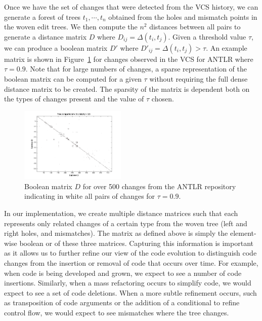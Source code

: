 Once we have the set of changes that were detected from the VCS history, we
can generate a forest of trees $t_1, \cdots, t_n$ obtained from the holes and
mismatch points in the woven edit trees.  We then compute the $n^2$ distances
between all pairs to generate a distance matrix $D$ where $D_{ij} =
\Delta(t_i, t_j)$.  Given a threshold value $\tau$, we can produce a boolean
matrix $D'$ where $D'_{ij} = \Delta(t_i, t_j) > \tau$.  An example matrix is
shown in Figure~\ref{fig:boolmat} for changes observed in the VCS for ANTLR
where $\tau = 0.9$.  Note that for large numbers of changes, a sparse
representation of the boolean matrix can be computed for a given $\tau$
without requiring the full dense distance matrix to be created.  The sparsity
of the matrix is dependent both on the types of changes present and the value
of $\tau$ chosen.  

\begin{figure}
\begin{center}
\includegraphics[width=0.45\textwidth]{figures/distmatrix-0-9.png}
\caption{Boolean matrix $D$ for over 500 changes from the ANTLR repository indicating in white all pairs of
changes for $\tau = 0.9$.}
\label{fig:boolmat}
\end{center}
\end{figure}

In our implementation, we create multiple distance matrices such that each
represents only related changes of a certain type from the woven tree (left
and right holes, and mismatches).  The matrix as defined above is simply the
element-wise boolean or of these three matrices.  Capturing this information is
important as it allows us to further refine our view of the code evolution to
distinguish code changes from the insertion or removal of code that occurs
over time. For example, when code is being developed and grown, we expect to
see a number of code insertions. Similarly, when a mass refactoring occurs to
simplify code, we would expect to see a set of code deletions.  When a more
subtle refinement occurs, such as transposition of code arguments or the
addition of a conditional to refine control flow, we would expect to see
mismatches where the tree changes.

